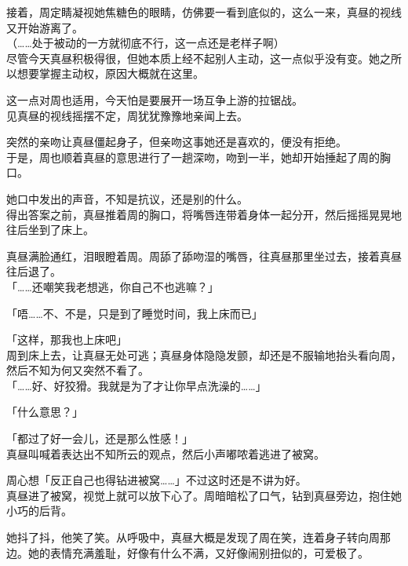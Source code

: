 接着，周定睛凝视她焦糖色的眼睛，仿佛要一看到底似的，这么一来，真昼的视线又开始游离了。\\

（……处于被动的一方就彻底不行，这一点还是老样子啊）\\

尽管今天真昼积极得很，但她本质上经不起别人主动，这一点似乎没有变。她之所以想要掌握主动权，原因大概就在这里。

这一点对周也适用，今天怕是要展开一场互争上游的拉锯战。\\

见真昼的视线摇摆不定，周犹犹豫豫地亲闻上去。

突然的亲吻让真昼僵起身子，但亲吻这事她还是喜欢的，便没有拒绝。\\

于是，周也顺着真昼的意思进行了一趟深吻，吻到一半，她却开始捶起了周的胸口。

她口中发出的声音，不知是抗议，还是别的什么。\\

得出答案之前，真昼推着周的胸口，将嘴唇连带着身体一起分开，然后摇摇晃晃地往后坐到了床上。

真昼满脸通红，泪眼瞪着周。周舔了舔吻湿的嘴唇，往真昼那里坐过去，接着真昼往后退了。\\

「……还嘲笑我老想逃，你自己不也逃嘛？」

「唔……不、不是，只是到了睡觉时间，我上床而已」

「这样，那我也上床吧」\\

周到床上去，让真昼无处可逃；真昼身体隐隐发颤，却还是不服输地抬头看向周，然后不知为何又突然不看了。\\

「……好、好狡猾。我就是为了才让你早点洗澡的……」

「什么意思？」

「都过了好一会儿，还是那么性感！」\\

真昼叫喊着表达出不知所云的观点，然后小声嘟哝着逃进了被窝。

周心想「反正自己也得钻进被窝……」不过这时还是不讲为好。\\

真昼进了被窝，视觉上就可以放下心了。周暗暗松了口气，钻到真昼旁边，抱住她小巧的后背。

她抖了抖，他笑了笑。从呼吸中，真昼大概是发现了周在笑，连着身子转向周那边。她的表情充满羞耻，好像有什么不满，又好像闹别扭似的，可爱极了。\\

